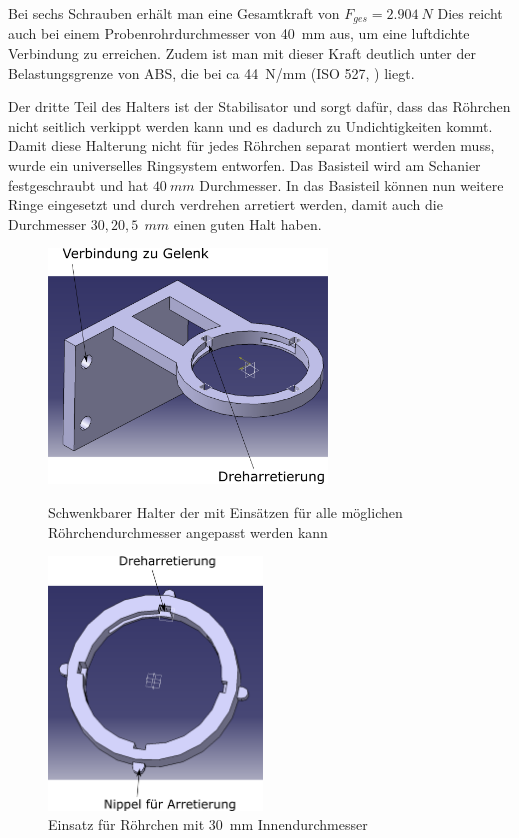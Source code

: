 Bei sechs Schrauben erhält man eine Gesamtkraft von $F_{ges} = \SI{2,904}{N}$ Dies reicht auch bei einem Probenrohrdurchmesser von \SI{40}{mm} aus, um eine luftdichte Verbindung zu erreichen. Zudem ist man mit dieser Kraft deutlich unter der Belastungsgrenze von ABS, die bei ca \SI{44}{N/mm} (ISO 527, \cite{C.Dallner2006, ThyssenPlastics}) liegt.

Der dritte Teil des Halters ist der Stabilisator und sorgt dafür, dass das Röhrchen nicht seitlich verkippt werden kann und es dadurch zu Undichtigkeiten kommt. Damit diese Halterung nicht für jedes Röhrchen separat montiert werden muss, wurde ein universelles Ringsystem entworfen. Das Basisteil wird am Schanier festgeschraubt und hat $\SI{40}{mm}$ Durchmesser. In das Basisteil können nun weitere Ringe eingesetzt und durch verdrehen arretiert werden, damit auch die Durchmesser $30,20,5\SI{}{\ mm}$ einen guten Halt haben.

	\begin{figure}[h]
		\begin{minipage}[hbt]{7.4cm}
			\centering
			\includegraphics[width=7.4cm]{Basishalter.png}
			\caption[Röhrchenhalter oben]{Schwenkbarer Halter der mit Einsätzen für alle möglichen Röhrchendurchmesser angepasst werden kann}
		\end{minipage}
		\hfill
		\begin{minipage}[hbt]{5.7cm}
			\centering
			\includegraphics[width=5.7cm]{Basishalter_Einsatz.png}
			\caption[Röhrchenhalter Einsatz oben]{Einsatz für Röhrchen mit \SI{30}{mm} Innendurchmesser}
		\end{minipage}
	\end{figure}
	
